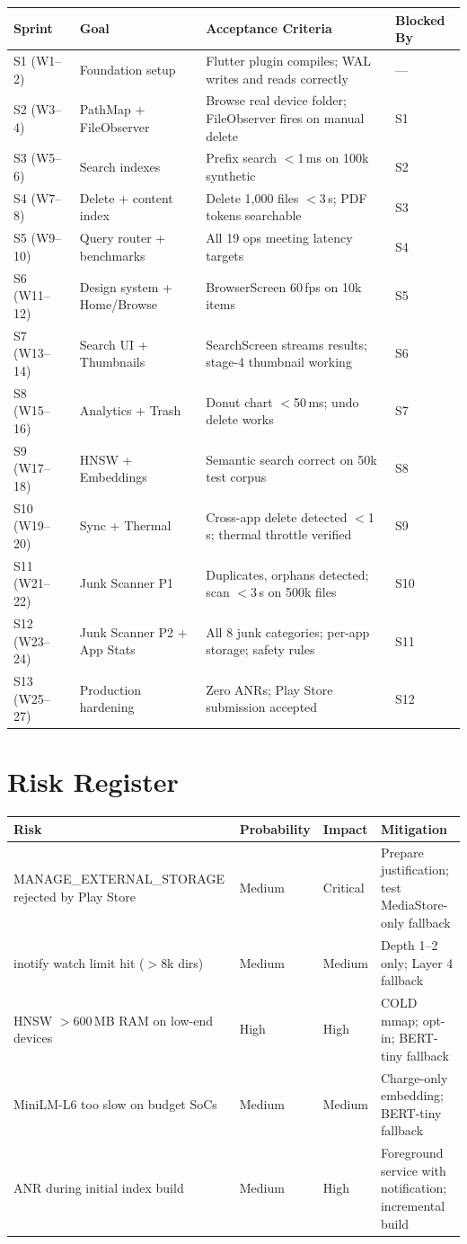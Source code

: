 \begin{longtable}{@{}p{12mm}p{28mm}p{52mm}p{42mm}@{}}
\toprule
\textbf{Sprint} & \textbf{Goal} & \textbf{Acceptance Criteria} & \textbf{Blocked By} \\
\midrule
S1 (W1--2) & Foundation setup & Flutter plugin compiles; WAL writes and reads correctly & --- \\
S2 (W3--4) & PathMap + FileObserver & Browse real device folder; FileObserver fires on manual delete & S1 \\
S3 (W5--6) & Search indexes & Prefix search $<$1\,ms on 100k synthetic & S2 \\
S4 (W7--8) & Delete + content index & Delete 1,000 files $<$3\,s; PDF tokens searchable & S3 \\
S5 (W9--10) & Query router + benchmarks & All 19 ops meeting latency targets & S4 \\
S6 (W11--12) & Design system + Home/Browse & BrowserScreen 60\,fps on 10k items & S5 \\
S7 (W13--14) & Search UI + Thumbnails & SearchScreen streams results; stage-4 thumbnail working & S6 \\
S8 (W15--16) & Analytics + Trash & Donut chart $<$50\,ms; undo delete works & S7 \\
S9 (W17--18) & HNSW + Embeddings & Semantic search correct on 50k test corpus & S8 \\
S10 (W19--20) & Sync + Thermal & Cross-app delete detected $<$1\,s; thermal throttle verified & S9 \\
S11 (W21--22) & Junk Scanner P1 & Duplicates, orphans detected; scan $<$3\,s on 500k files & S10 \\
S12 (W23--24) & Junk Scanner P2 + App Stats & All 8 junk categories; per-app storage; safety rules & S11 \\
S13 (W25--27) & Production hardening & Zero ANRs; Play Store submission accepted & S12 \\
\bottomrule
\end{longtable}

\section{Risk Register}

\begin{longtable}{@{}p{46mm}p{18mm}p{28mm}p{44mm}@{}}
\toprule
\textbf{Risk} & \textbf{Probability} & \textbf{Impact} & \textbf{Mitigation} \\
\midrule
MANAGE\_EXTERNAL\_STORAGE rejected by Play Store & Medium & Critical & Prepare justification; test MediaStore-only fallback \\
inotify watch limit hit ($>$8k dirs) & Medium & Medium & Depth 1--2 only; Layer 4 fallback \\
HNSW $>$600\,MB RAM on low-end devices & High & High & COLD mmap; opt-in; BERT-tiny fallback \\
MiniLM-L6 too slow on budget SoCs & Medium & Medium & Charge-only embedding; BERT-tiny fallback \\
ANR during initial index build & Medium & High & Foreground service with notification; incremental build \\
\bottomrule
\end{longtable}

